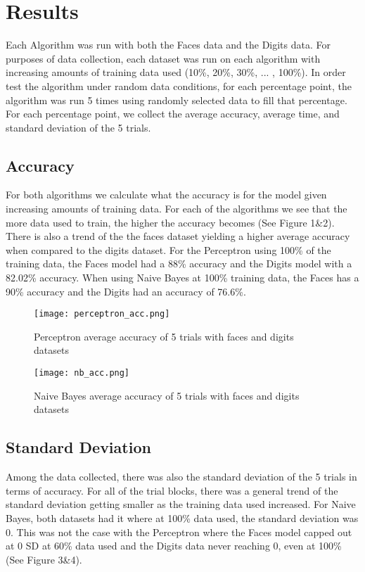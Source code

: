 \documentclass[titlepage]{article}
\begin{document}
\section{Results}
Each Algorithm was run with both the Faces data and the Digits data. For purposes of data collection, each dataset was run on each algorithm with increasing amounts of training data used (10\%, 20\%, 30\%, ... , 100\%). In order test the algorithm under random data conditions, for each percentage point, the algorithm was run 5 times using randomly selected data to fill that percentage. For each percentage point, we collect the average accuracy, average time, and standard deviation of the 5 trials. \\
\newpage
\subsection{Accuracy}
For both algorithms we calculate what the accuracy is for the model given increasing amounts of training data. For each of the algorithms we see that the more data used to train, the higher the accuracy becomes (See Figure 1\&2). There is also a trend of the the faces dataset yielding a higher average accuracy when compared to the digits dataset. For the Perceptron using 100\% of the training data, the Faces model had a 88\% accuracy and the Digits model with a 82.02\% accuracy. When using Naive Bayes at 100\% training data, the Faces has a 90\% accuracy and the Digits had an accuracy of 76.6\%.

\begin{figure}[H]
\centering
\texttt{[image: perceptron\_acc.png]}
\caption{Perceptron average accuracy of 5 trials with faces and digits datasets}
\end{figure}

\begin{figure}[H]
\centering
\texttt{[image: nb\_acc.png]}
\caption{Naive Bayes average accuracy of 5 trials with faces and digits datasets}
\end{figure}

\subsection{Standard Deviation}
Among the data collected, there was also the standard deviation of the 5 trials in terms of accuracy. For all of the trial blocks, there was a general trend of the standard deviation getting smaller as the training data used increased. For Naive Bayes, both datasets had it where at 100\% data used, the standard deviation was 0. This was not the case with the Perceptron where the Faces model capped out at 0 SD at 60\% data used and the Digits data never reaching 0, even at 100\% (See Figure 3\&4).
\end{document}
